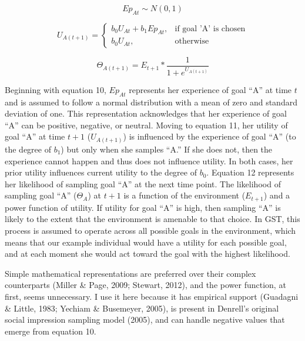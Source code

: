 \documentclass[english,,man]{apa6}
\theoremstyle{definition}
\theoremstyle{definition}
\theoremstyle{definition}
\theoremstyle{remark}
\begin{document}
\begin{equation}
Ep_{At} \sim {N}(0,1)
\end{equation}

\begin{equation}
U_{A(t+1)} = 
  \begin{cases}
  b_0 U_{At} + b_1 Ep_{At}, & \text{if goal 'A' is chosen}\\
  b_0 U_{At}, & \text{otherwise}
  \end{cases}
\end{equation}

\begin{equation}
\Theta_{A(t+1)} = E_{t+1} * {\frac {1}{1 + e^{U_{A(t+1)}}}}
\end{equation}

Beginning with equation 10, \(Ep_{At}\) represents her experience of
goal \enquote{A} at time \(t\) and is assumed to follow a normal
distribution with a mean of zero and standard deviation of one. This
representation acknowledges that her experience of goal \enquote{A} can
be positive, negative, or neutral. Moving to equation 11, her utility of
goal \enquote{A} at time \(t+1\) (\(U_{A(t+1)}\)) is influenced by the
experience of goal \enquote{A} (to the degree of \(b_1\)) but only when
she samples \enquote{A.} If she does not, then the experience cannot
happen and thus does not influence utility. In both cases, her prior
utility influences current utility to the degree of \(b_0\). Equation 12
represents her likelihood of sampling goal \enquote{A} at the next time
point. The likelihood of sampling goal \enquote{A} (\(\Theta_{A}\)) at
\(t+1\) is a function of the environment (\(E_{t+1}\)) and a power
function of utility. If utility for goal \enquote{A} is high, then
sampling \enquote{A} is likely to the extent that the environment is
amenable to that choice. In GST, this process is assumed to operate
across all possible goals in the environment, which means that our
example individual would have a utility for each possible goal, and at
each moment she would act toward the goal with the highest likelihood.

Simple mathematical representations are preferred over their complex
counterparts (Miller \& Page, 2009; Stewart, 2012), and the power
function, at first, seems unnecessary. I use it here because it has
empirical support (Guadagni \& Little, 1983; Yechiam \& Busemeyer,
2005), is present in Denrell's original social impression sampling model
(2005), and can handle negative values that emerge from equation 10.
\end{document}
